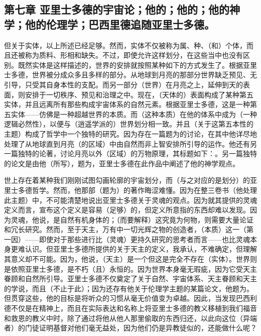 
\subsection{第七章 亚里士多德的宇宙论；他的；他的；他的神学；他的伦理学；巴西里德追随亚里士多德。}

但关于实体，以上所述已经足够。然而，实体不仅被称为属、种、（和）个体，而且还被称为质料、形相和缺失。不过，即使允许这样划分，在这些当中也没有区别。既然实体是这样描述的，世界的安排就按照某种如下的方式发生了。根据亚里士多德，世界被分成众多且多样的部分。从地球到月亮的那部分世界缺乏预见、无引导，只受其自身本性的支配。而另一部分（世界）在月亮之上，延伸到天的表面，则安排于一切秩序、预见和治理之中。现在，（天体的）表面构成了某种第五实体，并且远离所有那些构成宇宙体系的自然元素。根据亚里士多德，这是一种第五实体——仿佛是一种超越世界的本质。而（这种本质）在他的体系中成为（一种逻辑必然性），以便与（逍遥学派的）世界划分相一致。并且（关于这第五本性的主题）构成了哲学中一个独特的研究。因为存在一篇题为的讨论，在其中他详尽地处理了从地球直到月亮（的区域）中由自然而非上智安排所引导的运作。他还有另一篇独特的论著，讨论月亮以外（区域）的万物原理，其标题如下：。另一篇独特的论文是由他（所写），题为，亚里士多德在此作品中阐述了他的神学观点。\par

世上存在着某种我们刚刚试图勾画轮廓的宇宙划分，而（与之对应的是划分）的亚里士多德哲学。然而，他那部（题为）的著作晦涩难懂。因为在整三卷书（他处理此主题）中，不可能清楚地说出亚里士多德关于灵魂的观点。因为就其提供的灵魂定义而言，宣布这个定义是容易（足够）的，但定义所意指的东西却难以发现。因为灵魂，他说，是自然有机身体的；（而要解释）这究竟为何物，则需要大量论证和冗长研究。然而，至于天主，万有中一切光辉之物的创造者，（本质）这一（第一因）——即使对于那些进行比（灵魂）更持久研究的思考者而言——也比灵魂本身更难认识。但亚里士多德所提供的关于天主的定义，我承认，不难确定，但理解其意义却不可能。因为，他说，（天主）是一个但这是完全不存在（实体）。世界则是依照亚里士多德，是不朽（且）永恒的。因为世界本身毫无瑕疵，因为它受天主眷顾和自然所引导。亚里士多德不仅奠定了关于自然、宇宙体系、天主眷顾和天主的学说，而且（不止于此）；因为还存有他关于伦理学主题的某篇论文，他题为。但贯穿这些，他的目标是将听众的习惯从毫无价值变为卓越。因此，当发现巴西利德不仅是在精神上，而且在实际表达和名称上将亚里士多德的教义移植到我们福音和救恩的教义中时，除了通过将他从他人那里偷取的东西归还，以此向这位（异端者）的门徒证明基督对他们毫无益处，因为他们仍是异教徒似的，还能做什么呢？\par

